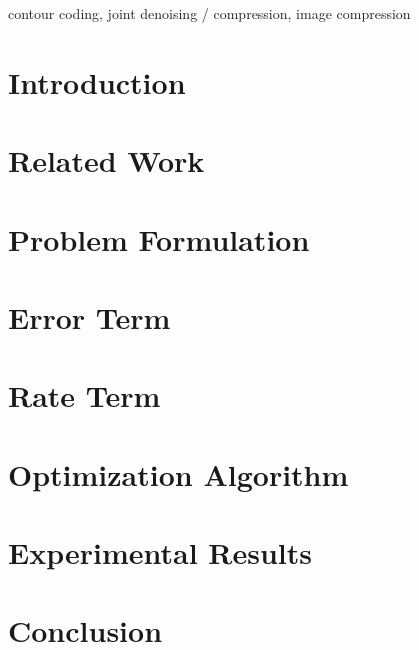 \documentclass[10pt,twocolumn,twoside]{IEEEtran}
\begin{document}
\begin{IEEEkeywords}
contour coding, joint denoising / compression, image compression
\end{IEEEkeywords}

\IEEEpeerreviewmaketitle

\section{Introduction}
\label{sec:intro}


\section{Related Work}
\label{sec:related}


\section{Problem Formulation}
\label{sec:problem}


\section{Error Term}
\label{sec:error}


\section{Rate Term}
\label{sec:rate}


%

\section{Optimization Algorithm}
\label{sec:algorithm}


\section{Experimental Results}
\label{sec:results}


\section{Conclusion}
\label{sec:conclude}




\end{document}
